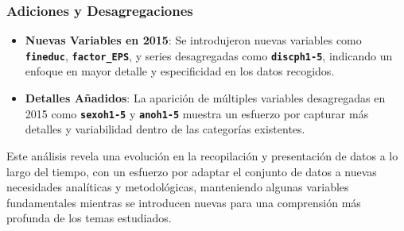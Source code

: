 \documentclass[
]{article}
\begin{document}
\hypertarget{adiciones-y-desagregaciones}{%
\subsubsection{\texorpdfstring{\textbf{Adiciones y
Desagregaciones}}{Adiciones y Desagregaciones}}\label{adiciones-y-desagregaciones}}

\begin{itemize}
\item
  \textbf{Nuevas Variables en 2015}: Se introdujeron nuevas variables
  como \textbf{\texttt{fineduc}}, \textbf{\texttt{factor\_EPS}}, y
  series desagregadas como \textbf{\texttt{discph1-5}}, indicando un
  enfoque en mayor detalle y especificidad en los datos recogidos.
\item
  \textbf{Detalles Añadidos}: La aparición de múltiples variables
  desagregadas en 2015 como \textbf{\texttt{sexoh1-5}} y
  \textbf{\texttt{anoh1-5}} muestra un esfuerzo por capturar más
  detalles y variabilidad dentro de las categorías existentes.
\end{itemize}

Este análisis revela una evolución en la recopilación y presentación de
datos a lo largo del tiempo, con un esfuerzo por adaptar el conjunto de
datos a nuevas necesidades analíticas y metodológicas, manteniendo
algunas variables fundamentales mientras se introducen nuevas para una
comprensión más profunda de los temas estudiados.
\end{document}
